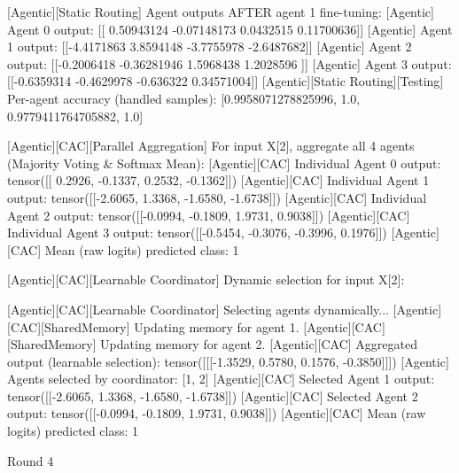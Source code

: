 [Agentic][Static Routing] Agent outputs AFTER agent 1 fine-tuning:
[Agentic] Agent 0 output: [[ 0.50943124 -0.07148173  0.0432515   0.11700636]]
[Agentic] Agent 1 output: [[-4.4171863  3.8594148 -3.7755978 -2.6487682]]
[Agentic] Agent 2 output: [[-0.2006418  -0.36281946  1.5968438   1.2028596 ]]
[Agentic] Agent 3 output: [[-0.6359314  -0.4629978  -0.636322    0.34571004]]
[Agentic][Static Routing][Testing] Per-agent accuracy (handled samples): [0.9958071278825996, 1.0, 0.9779411764705882, 1.0]

[Agentic][CAC][Parallel Aggregation] For input X[2], aggregate all 4 agents (Majority Voting & Softmax Mean):
[Agentic][CAC] Individual Agent 0 output: tensor([[ 0.2926, -0.1337,  0.2532, -0.1362]])
[Agentic][CAC] Individual Agent 1 output: tensor([[-2.6065,  1.3368, -1.6580, -1.6738]])
[Agentic][CAC] Individual Agent 2 output: tensor([[-0.0994, -0.1809,  1.9731,  0.9038]])
[Agentic][CAC] Individual Agent 3 output: tensor([[-0.5454, -0.3076, -0.3996,  0.1976]])
[Agentic][CAC] Mean (raw logits) predicted class: 1

[Agentic][CAC][Learnable Coordinator] Dynamic selection for input X[2]:

[Agentic][CAC][Learnable Coordinator] Selecting agents dynamically...
[Agentic][CAC][SharedMemory] Updating memory for agent 1.
[Agentic][CAC][SharedMemory] Updating memory for agent 2.
[Agentic][CAC] Aggregated output (learnable selection): tensor([[[-1.3529,  0.5780,  0.1576, -0.3850]]])
[Agentic] Agents selected by coordinator: [1, 2]
[Agentic][CAC] Selected Agent 1 output: tensor([[-2.6065,  1.3368, -1.6580, -1.6738]])
[Agentic][CAC] Selected Agent 2 output: tensor([[-0.0994, -0.1809,  1.9731,  0.9038]])
[Agentic][CAC] Mean (raw logits) predicted class: 1

Round 4


